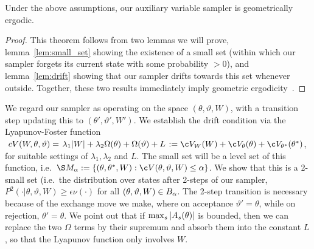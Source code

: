 \begin{theorem}
Under the above assumptions, our auxiliary variable sampler is
geometrically ergodic.  \label{thm:geom_erg} 
\end{theorem}
\begin{proof}
\noindent This theorem follows from two lemmas we will prove, 
lemma~\ref{lem:small_set} showing the existence of a small set (within 
which our sampler forgets its 
current state with some probability $>0$), and lemma~\ref{lem:drift}
showing that our sampler drifts towards this set whenever 
outside. Together, these two results immediately imply geometric 
ergodicity~\citep[Theorems 15.0.1 and Lemma 15.2.8]{meyn2009markov}.
\end{proof}
We regard our sampler as operating on the space $(\theta,\vartheta,W)$, 
with a transition step updating this to $(\theta',\vartheta',W')$. 
We establish the drift condition via the Lyapunov-Foster function
$\ c V(W,\theta,\vartheta) = \left. \lambda_1|W| + \lambda_2 \Omega(\theta) +
\Omega(\vartheta) +L \right. := \c V_W(W) + \c V_{\theta}(\theta) + 
\c V_{\theta^*}(\theta^*)$, for suitable settings of $\lambda_1,
  \lambda_2$ and $L$.
The small set will be a level set of this function, i.e.\ 
$\S M_\alpha := \{(\theta,\theta^*,W): \c V(\theta,\vartheta,W) \le \alpha\}$.
We show that this is a 2-small set (i.e.\ the distribution over states
after 2-steps of our sampler, $P^2(\cdot|\theta,\vartheta,W) \ge \epsilon 
\nu(\cdot)$ for all $(\theta,\vartheta,W) \in B_\alpha$. 
The 2-step transition is necessary because of the exchange move we make, 
where on acceptance $\vartheta'=\theta$, while on rejection, $\theta'=\theta$.
We point out that if ${\max_s |A_s(\theta)|}$ is bounded, then we can replace
the two $\Omega$ terms by their supremum and absorb them into the 
constant $L$, so that the Lyapunov function only involves $W$.


